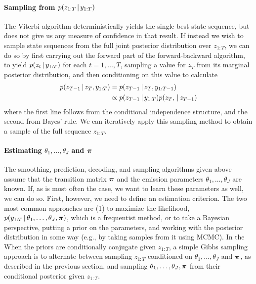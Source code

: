   \paragraph{Sampling from $p(z_{1:T} \, \vert \, y_{1:T})$}
  The Viterbi algorithm deterministically yields the single best state
  sequence, but does not give us any measure of confidence in that
  result.  If instead we wish to sample state sequences from the
  full joint posterior distribution over $z_{1:T}$, we can do so by
  first carrying out the forward part of the forward-backward
  algorithm, to yield $p(z_t \, \vert \, y_{1:T})$ for each $t = 1, \dots,
  T$, sampling a value for
  $z_T$ from its marginal posterior distribution,
  and then conditioning on this value to calculate
  \begin{align}
    p(z_{T-1} \, \vert \, z_T, y_{1:T}) &= p(z_{T-1} \, \vert \, z_T, y_{1:T-1})
    \\
    &\propto p(z_{T-1} \, \vert \, y_{1:T}) p(z_T, \, \vert \, z_{T-1})
  \end{align}
  where the first line follows from the conditional independence
  structure, and the second from Bayes' rule.  We can iteratively
  apply this sampling method to obtain a sample of the full sequence
  $z_{1:T}$.

  \paragraph{Estimating $\theta_1, \dots, \theta_J$ and $\boldsymbol{\pi}$}
  The smoothing, prediction, decoding, and sampling algorithms given
  above assume that the transition matrix $\boldsymbol{\pi}$ and the emission
  parameters $\theta_1, \dots, \theta_J$ are known.  If, as is most
  often the case, we want to learn these parameters as well, we can do
  so.  First, however, we need to define an estimation criterion.  The
  two most common approaches are (1) to maximize the likelihood,
  $p(y_{1:T} \, \vert \, \theta_1, \dots, \theta_J, \boldsymbol{\pi})$, which is a
  frequentist method, or to take a Bayesian perspective, putting a
  prior on the parameters, and working with the posterior distribution
  in some way (e.g., by taking samples from it using MCMC).  In the
  When the priors are conditionally conjugate given $z_{1:T}$, a simple
  Gibbs sampling approach is to alternate between sampling $z_{1:T}$
  conditioned on $\theta_1, \dots, \theta_J$ and $\boldsymbol{\pi}$, as described
  in the previous section, and sampling $\theta_1, \dots, \theta_J,
  \boldsymbol{\pi}$ from their conditional posterior given $z_{1:T}$.

